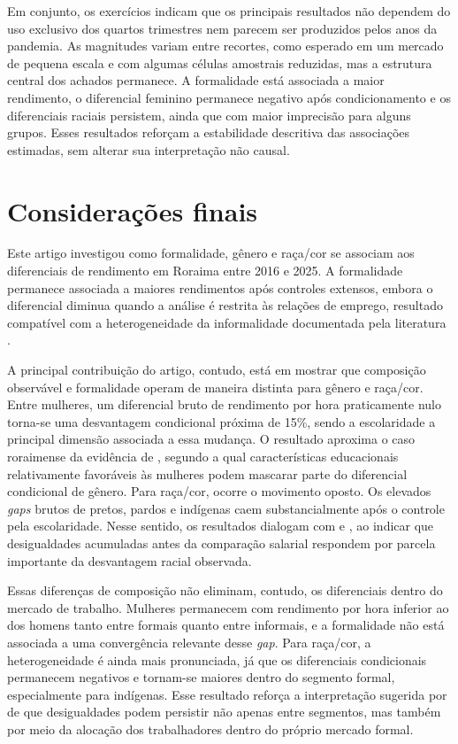 \documentclass[12pt]{article}
\begin{document}
Em conjunto, os exercícios indicam que os principais resultados não dependem
do uso exclusivo dos quartos trimestres nem parecem ser produzidos pelos anos
da pandemia. As magnitudes variam entre recortes, como esperado em um mercado
de pequena escala e com algumas células amostrais reduzidas, mas a estrutura
central dos achados permanece. A formalidade está associada a maior rendimento,
o diferencial feminino permanece negativo após condicionamento e os
diferenciais raciais persistem, ainda que com maior imprecisão para alguns
grupos. Esses resultados reforçam a estabilidade descritiva das associações
estimadas, sem alterar sua interpretação não causal.

\section{Considerações finais}
\label{sec:conclusao}

Este artigo investigou como formalidade, gênero e raça/cor se associam aos 
diferenciais de rendimento em Roraima entre 2016 e 2025. A formalidade 
permanece associada a maiores rendimentos após controles extensos, embora 
o diferencial diminua quando a análise é restrita às relações de emprego, 
resultado compatível com a heterogeneidade da informalidade documentada 
pela literatura \citep{curi2006, meghir2015, ulyssea2018}.

A principal contribuição do artigo, contudo, está em mostrar que composição
observável e formalidade operam de maneira distinta para gênero e raça/cor.
Entre mulheres, um diferencial bruto de rendimento por hora praticamente nulo
torna-se uma desvantagem condicional próxima de 15\%, sendo a escolaridade a
principal dimensão associada a essa mudança. O resultado aproxima o caso
roraimense da evidência de \citet{giuberti2005}, segundo a qual
características educacionais relativamente favoráveis às mulheres podem
mascarar parte do diferencial condicional de gênero. Para raça/cor, ocorre o
movimento oposto. Os elevados \textit{gaps} brutos de pretos, pardos e indígenas caem
substancialmente após o controle pela escolaridade. Nesse sentido, os resultados
dialogam com \citet{soares2000} e \citet{campante2004}, ao indicar que desigualdades
acumuladas antes da comparação salarial respondem por parcela importante da
desvantagem racial observada.

Essas diferenças de composição não eliminam, contudo, os diferenciais dentro
do mercado de trabalho. Mulheres permanecem com rendimento por hora inferior
ao dos homens tanto entre formais quanto entre informais, e a formalidade não
está associada a uma convergência relevante desse \textit{gap}. Para raça/cor, a
heterogeneidade é ainda mais pronunciada, já que os diferenciais condicionais
permanecem negativos e tornam-se maiores dentro do segmento formal,
especialmente para indígenas. Esse resultado reforça a interpretação sugerida
por \citet{gerard2021} de que desigualdades podem persistir não apenas entre
segmentos, mas também por meio da alocação dos trabalhadores dentro do próprio
mercado formal.
\end{document}
